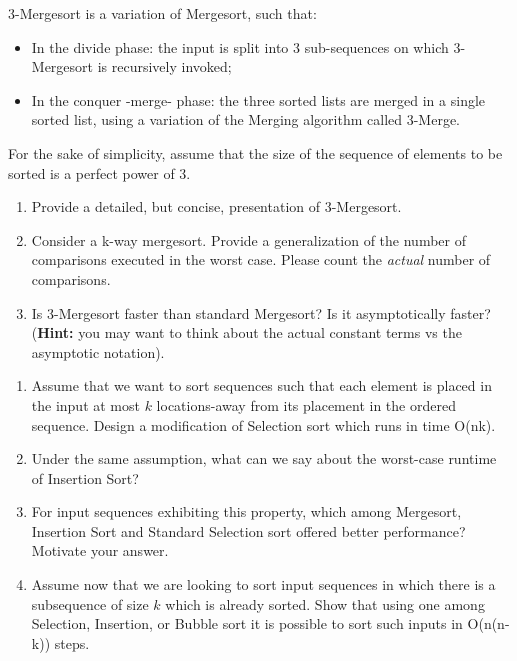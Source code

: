 \documentclass{common/cs157}
\begin{document}
\homeworkhandin %

\begin{problem}{1}
3-Mergesort is a variation of Mergesort, such that:
\begin{itemize}
    \item In the divide phase: the input is split into 3 sub-sequences on which 3-Mergesort is recursively invoked;
    \item In the conquer -merge- phase: the three sorted lists are merged in a single sorted list, using a variation of the Merging algorithm called 3-Merge. 
\end{itemize}
For the sake of simplicity, assume that the size of the sequence of elements to be sorted is a perfect power of 3.
\begin{enumerate}
    \item Provide a detailed, but concise, presentation of 3-Mergesort.
    \item Consider a k-way mergesort. Provide a generalization of the number of comparisons executed in the worst case. Please count the \emph{actual} number of comparisons.  
    \item Is 3-Mergesort faster than standard Mergesort? Is it asymptotically faster? (\textbf{Hint:} you may want to think about the actual constant terms vs the asymptotic notation).
\end{enumerate}
\end{problem}

\newpage

\begin{problem}{2}
\begin{enumerate}
    \item Assume that we want to sort sequences such that each element is placed in the input at most $k$ locations-away from its placement in the ordered sequence. Design a modification of Selection sort which runs in time O(nk).
    \item Under the same assumption, what can we say about the worst-case runtime of Insertion Sort?
    \item For input sequences exhibiting this property, which among Mergesort, Insertion Sort and Standard Selection sort offered better performance? Motivate your answer. 
    \item Assume now that we are looking to sort input sequences in which there is a subsequence of size $k$ which is already sorted. Show that using one among Selection, Insertion, or Bubble sort it is possible to sort such inputs in O(n(n-k)) steps.
\end{enumerate}
\end{problem}
\end{document}
